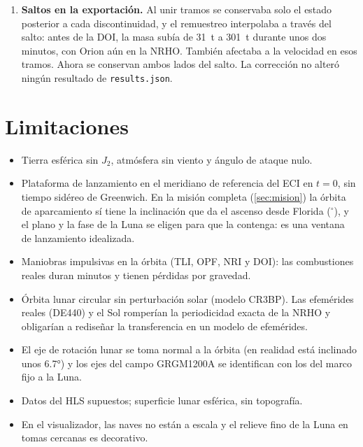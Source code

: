 \documentclass[11pt,a4paper]{article}
\begin{document}
\begin{enumerate}
  \item \textbf{Saltos en la exportación.} Al unir tramos se conservaba solo el estado posterior a cada discontinuidad, y el remuestreo interpolaba a través del salto: antes de la DOI, la masa subía de \SI{31}{t} a \SI{301}{t} durante unos dos minutos, con Orion aún en la NRHO. También afectaba a la velocidad en esos tramos. Ahora se conservan ambos lados del salto. La corrección no alteró ningún resultado de \texttt{results.json}.
\end{enumerate}

\section{Limitaciones}
\begin{itemize}
  \item Tierra esférica sin $J_2$, atmósfera sin viento y ángulo de ataque nulo.
  \item Plataforma de lanzamiento en el meridiano de referencia del ECI en $t=0$, sin tiempo sidéreo de Greenwich. En la misión completa (\autoref{sec:mision}) la órbita de aparcamiento sí tiene la inclinación que da el ascenso desde Florida (\RMParkingInclinationDeg$^\circ$), y el plano y la fase de la Luna se eligen para que la contenga: es una ventana de lanzamiento idealizada.
  \item Maniobras impulsivas en la órbita (TLI, OPF, NRI y DOI): las combustiones reales duran minutos y tienen pérdidas por gravedad.
  \item Órbita lunar circular sin perturbación solar (modelo CR3BP). Las efemérides reales (DE440) y el Sol romperían la periodicidad exacta de la NRHO y obligarían a rediseñar la transferencia en un modelo de efemérides.
  \item El eje de rotación lunar se toma normal a la órbita (en realidad está inclinado unos \ang{6.7}) y los ejes del campo GRGM1200A se identifican con los del marco fijo a la Luna.
  \item Datos del HLS supuestos; superficie lunar esférica, sin topografía.
  \item En el visualizador, las naves no están a escala y el relieve fino de la Luna en tomas cercanas es decorativo.
\end{itemize}

\end{document}
